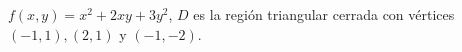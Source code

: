 \item $f(x, y) = x^2 + 2xy + 3y^2$, $D$ es la región triangular cerrada con vértices $(-1, 1), (2, 1)$ y $(-1, -2)$.
